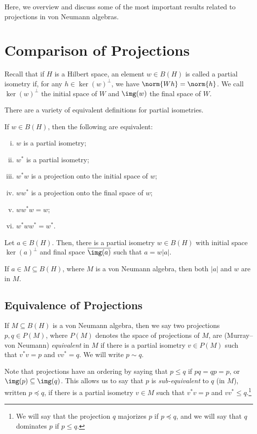 \documentclass[10pt]{mypackage}
\begin{document}
\RaggedRight
Here, we overview and discuss some of the most important results related to projections in von Neumann algebras.
\tableofcontents
\section{Comparison of Projections}%
Recall that if $H$ is a Hilbert space, an element $w\in B(H)$ is called a partial isometry if, for any $h\in  \ker\left( w \right) ^{\perp}$, we have $\norm{Wh} = \norm{h}$. We call $\ker\left( w \right)^{\perp}$ the initial space of $W$ and $\img(w)$ the final space of $W$.

There are a variety of equivalent definitions for partial isometries.
\begin{proposition}
  If $w\in B(H)$, then the following are equivalent:
  \begin{enumerate}[(i)]
    \item $w$ is a partial isometry;
    \item $w^{\ast}$ is a partial isometry;
    \item $w^{\ast}w$ is a projection onto the initial space of $w$;
    \item $ww^{\ast}$ is a projection onto the final space of $w$;
    \item $ww^{\ast}w = w$;
    \item $w^{\ast}ww^{\ast} = w^{\ast}$.
  \end{enumerate}
\end{proposition}
\begin{theorem}
  Let $a\in B(H)$. Then, there is a partial isometry $w\in B(H)$ with initial space $ \ker\left( a \right)^{\perp} $ and final space $ \overline{\img(a)} $ such that $a = w\left\vert a \right\vert$.

  If $a\in M\subseteq B(H)$, where $M$ is a von Neumann algebra, then both $\left\vert a \right\vert$ and $w$ are in $M$.
\end{theorem}
\subsection{Equivalence of Projections}%
If $M\subseteq B(H)$ is a von Neumann algebra, then we say two projections $p,q\in P(M)$, where $P(M)$ denotes the space of projections of $M$, are (Murray--von Neumann) \textit{equivalent} in $M$ if there is a partial isometry $v\in P(M)$ such that $v^{\ast}v = p$ and $vv^{\ast} = q$. We will write $p\sim q$.

Note that projections have an ordering by saying that $p\leq q$ if $pq = qp = p$, or $\img(p)\subseteq \img(q) $. This allows us to say that $p$ is \textit{sub-equivalent} to $q$ (in $M$), written $p\preceq q$, if there is a partial isometry $v\in M$ such that $v^{\ast}v = p$ and $vv^{\ast}\leq q$.\footnote{We will say that the projection $q$ majorizes $p$ if $p\preceq q$, and we will say that $q$ dominates $p$ if $p\leq q$.}
\end{document}
